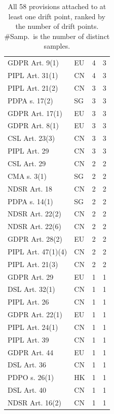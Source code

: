 \begin{table}[t]
\begin{tabularx}{\columnwidth}{X l r r}
GDPR Art. 9(1) & EU & 4 & 3 \\
PIPL Art. 31(1) & CN & 4 & 3 \\
PIPL Art. 21(2) & CN & 3 & 3 \\
PDPA s. 17(2) & SG & 3 & 3 \\
GDPR Art. 17(1) & EU & 3 & 3 \\
GDPR Art. 8(1) & EU & 3 & 3 \\
CSL Art. 23(3) & CN & 3 & 3 \\
PIPL Art. 29 & CN & 3 & 3 \\
CSL Art. 29 & CN & 2 & 2 \\
CMA s. 3(1) & SG & 2 & 2 \\
NDSR Art. 18 & CN & 2 & 2 \\
PDPA s. 14(1) & SG & 2 & 2 \\
NDSR Art. 22(2) & CN & 2 & 2 \\
NDSR Art. 22(6) & CN & 2 & 2 \\
GDPR Art. 28(2) & EU & 2 & 2 \\
PIPL Art. 47(1)(4) & CN & 2 & 2 \\
PIPL Art. 21(3) & CN & 2 & 2 \\
GDPR Art. 29 & EU & 1 & 1 \\
DSL Art. 32(1) & CN & 1 & 1 \\
PIPL Art. 26 & CN & 1 & 1 \\
GDPR Art. 22(1) & EU & 1 & 1 \\
PIPL Art. 24(1) & CN & 1 & 1 \\
PIPL Art. 39 & CN & 1 & 1 \\
GDPR Art. 44 & EU & 1 & 1 \\
DSL Art. 36 & CN & 1 & 1 \\
PDPO s. 26(1) & HK & 1 & 1 \\
DSL Art. 40 & CN & 1 & 1 \\
NDSR Art. 16(2) & CN & 1 & 1 \\
\bottomrule
\end{tabularx}
\caption{All 58 provisions attached to at least one drift point, ranked by the number of drift points. \#Samp.\ is the number of distinct samples.}
\label{tab:statute_coverage}
\end{table}
